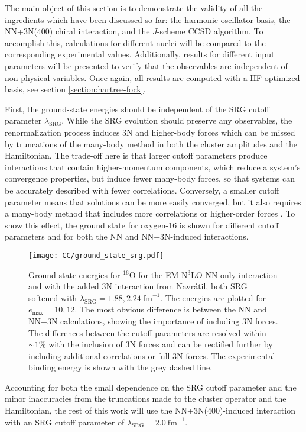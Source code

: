 \documentclass[thesis.tex]{subfiles}
\begin{document}
The main object of this section is to demonstrate the validity of all the ingredients which have been discussed so far: the harmonic oscillator basis, the NN+3N(400) chiral interaction, and the $J$-scheme CCSD algorithm.  To accomplish this, calculations for different nuclei will be compared to the corresponding experimental values.  Additionally, results for different input parameters will be presented to verify that the observables are independent of non-physical variables.  Once again, all results are computed with a HF-optimized basis, see section \ref{section:hartree-fock}.

First, the ground-state energies should be independent of the SRG cutoff parameter $\lambda_{\mathrm{SRG}}$.  While the SRG evolution should preserve any observables, the renormalization process induces 3N and higher-body forces which can be missed by truncations of the many-body method in both the cluster amplitudes and the Hamiltonian.  The trade-off here is that larger cutoff parameters produce interactions that contain higher-momentum components, which reduce a system's convergence properties, but induce fewer many-body forces, so that systems can be accurately described with fewer correlations.  Conversely, a smaller cutoff parameter means that solutions can be more easily converged, but it also requires a many-body method that includes more correlations or higher-order forces \cite{ROTH2012}.  To show this effect, the ground state for oxygen-16 is shown for different cutoff parameters and for both the NN and NN+3N-induced interactions.  
\begin{figure}[h!]
  \centering
  \texttt{[image: CC/ground\_state\_srg.pdf]}
  \caption{Ground-state energies for ${}^{16}$O for the EM N$^{3}$LO NN only interaction and with the added 3N interaction from Navr\'{a}til, both SRG softened with $\lambda_{\mathrm{SRG}}=1.88,2.24\ \mathrm{fm}^{-1}$.  The energies are plotted for $e_\mathrm{max}=10,12$.  The most obvious difference is between the NN and NN+3N calculations, showing the importance of including 3N forces.  The differences between the cutoff parameters are resolved within $\sim 1\%$ with the inclusion of 3N forces and can be rectified further by including additional correlations or full 3N forces.  The experimental binding energy is shown with the grey dashed line.}
  \label{fig:Ground_State_srg}
\end{figure}
Accounting for both the small dependence on the SRG cutoff parameter and the minor inaccuracies from the truncations made to the cluster operator and the Hamiltonian, the rest of this work will use the NN+3N(400)-induced interaction with an SRG cutoff parameter of $\lambda_{\mathrm{SRG}}=2.0\ \mathrm{fm}^{-1}$.
\end{document}
